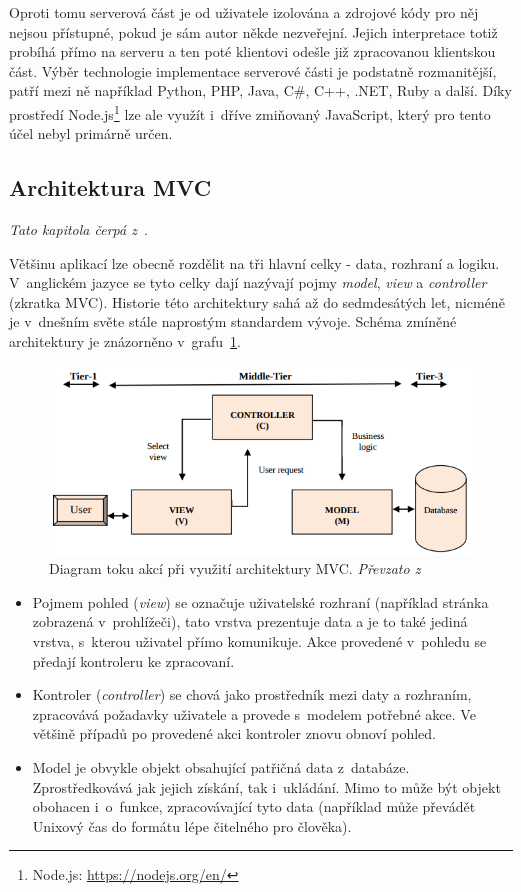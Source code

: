 Oproti tomu serverová část je od uživatele izolována a zdrojové kódy pro něj nejsou přístupné, pokud je sám autor někde nezveřejní. Jejich interpretace totiž probíhá přímo na serveru a ten poté klientovi odešle již zpracovanou klientskou část. Výběr technologie implementace serverové části je podstatně rozmanitější, patří mezi ně například Python, PHP, Java, C\#, C++, .NET, Ruby a další. Díky prostředí Node.js\footnote{Node.js: \url{https://nodejs.org/en/}} lze ale využít i~dříve zmiňovaný JavaScript, který pro tento účel nebyl primárně určen. 


\subsection{Architektura MVC}
\emph{Tato kapitola čerpá z~\cite{bib:mvc}}.

Většinu aplikací lze obecně rozdělit na tři hlavní celky - data, rozhraní a logiku. V~anglickém jazyce se tyto celky dají nazývají pojmy \emph{model}, \emph{view} a \emph{controller} (zkratka MVC). Historie této architektury sahá až do sedmdesátých let, nicméně je v~dnešním světe stále naprostým standardem vývoje. Schéma zmíněné architektury je znázorněno v~grafu~\ref{img:mvc}.

\begin{figure}[H]
	\centering
	\includegraphics[width=\textwidth]{obrazky-figures/mvc.png}
	\caption{Diagram toku akcí při využití architektury MVC. \emph{Převzato z~\cite{bib:mvc}}}
	\label{img:mvc}
\end{figure}

\begin{itemize}
\item Pojmem pohled (\emph{view}) se označuje uživatelské rozhraní (například stránka zobrazená v~prohlížeči), tato vrstva prezentuje data a je to také jediná vrstva, s~kterou uživatel přímo komunikuje. Akce provedené v~pohledu se předají kontroleru ke zpracovaní.
\item Kontroler (\emph{controller}) se chová jako prostředník mezi daty a rozhraním, zpracovává požadavky uživatele a provede s~modelem potřebné akce. Ve většině případů po provedené akci kontroler znovu obnoví pohled.
\item Model je obvykle objekt obsahující patřičná data z~databáze. Zprostředkovává jak jejich získání, tak i~ukládání. Mimo to může být objekt obohacen i~o~funkce, zpracovávající tyto data (například může převádět Unixový čas do formátu lépe čitelného pro člověka). 
\end{itemize}


